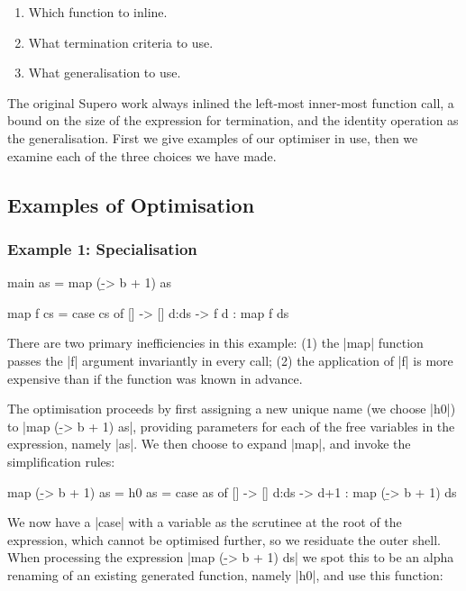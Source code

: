\documentclass{llncs}
\begin{document}
\begin{enumerate}
\item Which function to inline.
\item What termination criteria to use.
\item What generalisation to use.
\end{enumerate}

The original Supero work \cite{me:supero_ifl} always inlined the left-most inner-most function call, a bound on the size of the expression for termination, and the identity operation as the generalisation. First we give examples of our optimiser in use, then we examine each of the three choices we have made.

\subsection{Examples of Optimisation}

\subsubsection{Example 1: Specialisation}\hfill

\begin{code}
main as = map (\b -> b + 1) as

map f cs = case  cs of
                 []    -> []
                 d:ds  -> f d : map f ds
\end{code}

There are two primary inefficiencies in this example: (1) the |map| function passes the |f| argument invariantly in every call; (2) the application of |f| is more expensive than if the function was known in advance.

The optimisation proceeds by first assigning a new unique name (we choose |h0|) to |map (\b -> b + 1) as|, providing parameters for each of the free variables in the expression, namely |as|. We then choose to expand |map|, and invoke the simplification rules:

\begin{code}
map (\b -> b + 1) as = h0 as = case  as of
                                     []    -> []
                                     d:ds  -> d+1 : map (\b -> b + 1) ds
\end{code}

We now have a |case| with a variable as the scrutinee at the root of the expression, which cannot be optimised further, so we residuate the outer shell. When processing the expression |map (\b -> b + 1) ds| we spot this to be an alpha renaming of an existing generated function, namely |h0|, and use this function:
\end{document}
